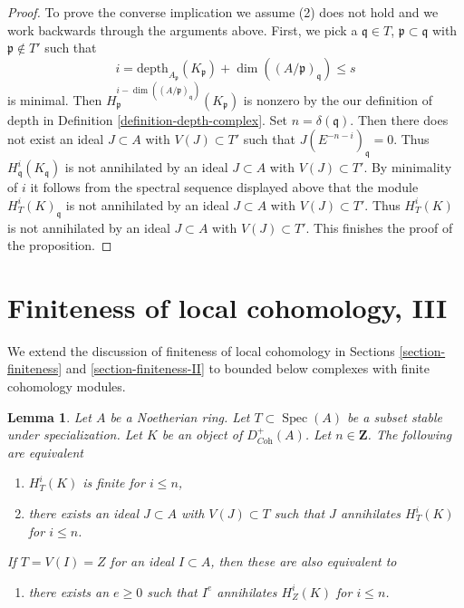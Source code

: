 \documentclass{stacks-project}
\theoremstyle{plain}
\newtheorem{lemma}[subsection]{Lemma}
\theoremstyle{definition}
\theoremstyle{remark}
\numberwithin{equation}{subsection}
\def\Spec{\mathop{\mathrm{Spec}}}
\begin{document}
\begin{proof}
\medskip\noindent
To prove the converse implication we assume (2) does not hold
and we work backwards through the arguments above. First, we pick a
$\mathfrak q \in T$, $\mathfrak p \subset \mathfrak q$
with $\mathfrak p \not \in T'$ such that
$$
i = \text{depth}_{A_\mathfrak p}(K_\mathfrak p) +
\dim((A/\mathfrak p)_\mathfrak q) \leq s
$$
is minimal. Then
$H^{i - \dim((A/\mathfrak p)_\mathfrak q)}_\mathfrak p(K_\mathfrak p)$
is nonzero by the our definition of depth in
Definition \ref{definition-depth-complex}.
Set $n = \delta(\mathfrak q)$. Then
there does not exist an ideal $J \subset A$ with $V(J) \subset T'$
such that $J(E^{-n - i})_\mathfrak q = 0$.
Thus $H^i_\mathfrak q(K_\mathfrak q)$ is not
annihilated by an ideal $J \subset A$ with $V(J) \subset T'$.
By minimality of $i$ it follows from the spectral sequence displayed above
that the module $H^i_T(K)_\mathfrak q$
is not annihilated by an ideal $J \subset A$
with $V(J) \subset T'$. Thus $H^i_T(K)$
is not annihilated by an ideal $J \subset A$
with $V(J) \subset T'$. This finishes the proof of the proposition.
\end{proof}







\section{Finiteness of local cohomology, III}
\label{section-finiteness-III}

\noindent
We extend the discussion of finiteness of local cohomology
in Sections \ref{section-finiteness} and \ref{section-finiteness-II}
to bounded below complexes with finite cohomology modules.

\begin{lemma}
\label{lemma-check-finiteness-local-cohomology-by-annihilator-complex}
Let $A$ be a Noetherian ring. Let $T \subset \Spec(A)$ be a subset stable
under specialization. Let $K$ be an object of $D_{\textit{Coh}}^+(A)$.
Let $n \in \mathbf{Z}$. The following are equivalent
\begin{enumerate}
\item $H^i_T(K)$ is finite for $i \leq n$,
\item there exists an ideal $J \subset A$ with $V(J) \subset T$
such that $J$ annihilates $H^i_T(K)$ for $i \leq n$.
\end{enumerate}
If $T = V(I) = Z$ for an ideal $I \subset A$, then these are also
equivalent to
\begin{enumerate}
\item[(3)] there exists an $e \geq 0$ such that $I^e$ annihilates
$H^i_Z(K)$ for $i \leq n$.
\end{enumerate}
\end{lemma}
\end{document}
